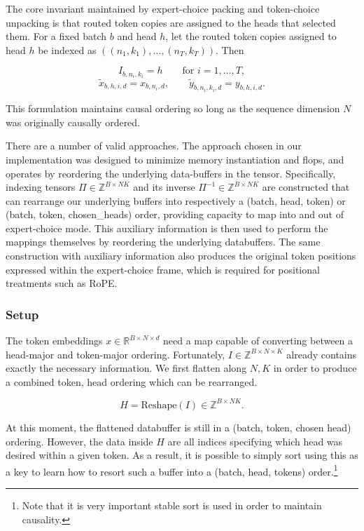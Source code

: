 \documentclass[11pt]{article}
\begin{document}
The core invariant maintained by expert-choice packing and token-choice unpacking is that routed token copies are assigned to the heads that selected them. For a fixed batch $b$ and head $h$, let the routed token copies assigned to head $h$ be indexed as $((n_1,k_1), \dots, (n_T,k_T))$. Then

\[
I_{b,n_i,k_i}=h \qquad \text{for } i=1,\dots,T,
\]
\[
\tilde{x}_{b,h,i,d}=x_{b,n_i,d},
\qquad
\tilde{y}_{b,n_i,k_i,d}=y_{b,h,i,d}.
\]

This formulation maintains causal ordering so long as the sequence dimension $N$ was originally causally ordered.

There are a number of valid approaches. The approach chosen in our implementation was designed to minimize memory instantiation and flops, and operates by reordering the underlying data-buffers in the tensor. Specifically, indexing tensors $\Pi \in \mathbb{Z}^{B \times NK}$ and its inverse $\Pi^{-1} \in \mathbb{Z}^{B \times NK}$ are constructed that can rearrange our underlying buffers into respectively a (batch, head, token) or (batch, token, chosen\_heads) order, providing capacity to map into and out of expert-choice mode. This auxiliary information is then used to perform the mappings themselves by reordering the underlying databuffers. The same construction with auxiliary information also produces the original token positions expressed within the expert-choice frame, which is required for positional treatments such as RoPE.

\subsubsection{Setup}

The token embeddings $x \in \mathbb{R}^{B \times N \times d}$ need a map capable of converting between a head-major and token-major ordering. Fortunately, $I \in \mathbb{Z}^{B \times N \times K}$ already contains exactly the necessary information. We first flatten along $N, K$ in order to produce a combined token, head ordering which can be rearranged.

\[
H = \mathrm{Reshape}(I) \in \mathbb{Z}^{B \times NK}.
\]

At this moment, the flattened databuffer is still in a (batch, token, chosen head) ordering. However, the data inside $H$ are all indices specifying which head was desired within a given token. As a result, it is possible to simply sort using this as a key to learn how to resort such a buffer into a (batch, head, tokens) order.\footnote{Note that it is very important stable sort is used in order to maintain causality.}
\end{document}
